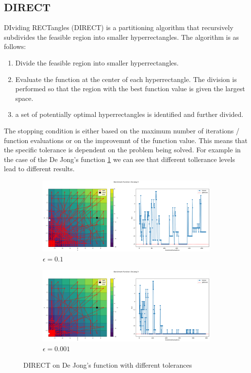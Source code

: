 \subsection{DIRECT}
DIviding RECTangles (DIRECT) is a partitioning algorithm that recursively subdivides the feasible region into smaller hyperrectangles. The algorithm is as follows:
\begin{enumerate}
    \item Divide the feasible region into smaller hyperrectangles.
    \item Evaluate the function at the center of each hyperrectangle. The division is performed so that the region with the best function value is given the largest space.
    \item a set of potentially optimal hyperrectangles is identified and further divided.
\end{enumerate}
The stopping condition is either based on the maximum number of iterations / function evaluations or on the improvemnt of the function value. This means that the specific tolerance is dependent on the problem being solved. For example in the case of the De Jong's function \ref{fig:dejong-tolerance} we can see that different tollerance levels lead to different results.
\begin{figure}[H]
    \begin{subfigure}{0.5\textwidth}
        \includegraphics[width=\textwidth]{lab2/imgs/di_dejong_eps_01.png}
        \caption{$\epsilon =0.1$}
    \end{subfigure}
    \begin{subfigure}{0.5\textwidth}
        \includegraphics[width=\textwidth]{lab2/imgs/di_dejong_eps_001.png}
        \caption{$\epsilon =0.001$}
    \end{subfigure}
    \caption{DIRECT on De Jong's function with different tolerances}
    \label{fig:dejong-tolerance}
\end{figure}
